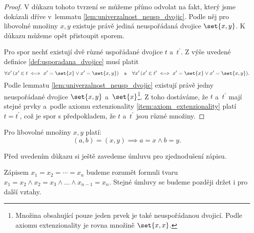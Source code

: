 \begin{proof}
    V důkazu tohoto tvrzení se můžeme přímo odvolat na fakt, který jsme dokázali dříve v~lemmatu \ref{lem:univerzalnost_neusp_dvojic}. Podle něj pro libovolné množiny $x,y$ existuje právě jediná neuspořádaná dvojice $\set{x,y}$. K důkazu můžeme opět přistoupit sporem.\par
    Pro spor nechť existují dvě různé uspořádané dvojice $t$ a~$t^\prime$. Z výše uvedené definice \ref{def:usporadana_dvojice} musí platit
    \begin{equation*}
        \forall x^\prime\,(x^\prime\in t \iff x^\prime=\set{x} \lor x^\prime=\set{x,y})\quad\text{a}\quad \forall x^\prime\,(x^\prime\in t^\prime \iff x^\prime=\set{x} \lor x^\prime=\set{x,y}).
    \end{equation*}
    Podle lemmatu \ref{lem:univerzalnost_neusp_dvojic} existují právě jedny neuspořádané dvojice $\set{x,y}$ a~$\set{x}$\footnote{Množina obsahující pouze jeden prvek je také neuspořádanou dvojicí. Podle axiomu extenzionality je rovna množině $\set{x,x}$.}. Z toho dostáváme, že $t$ a~$t^\prime$ mají stejné prvky a~podle axiomu extenzionality \ref{item:axiom_extenzionality} platí $t=t^\prime$, což je spor s předpokladem, že $t$ a~$t^\prime$ jsou různé množiny.
\end{proof}
\begin{lemma}\label{lem:vlastnost_usp_dvojic}
    Pro libovolné množiny $x,y$ platí:
    \begin{equation*}
        (a,b)=(x,y) \implies a=x \land b=y.
    \end{equation*}
\end{lemma}
Před uvedením důkazu si ještě zavedeme úmluvu pro zjednodušení zápisu.
\begin{convention}
    Zápisem $x_1=x_2=\cdots=x_n$ budeme rozumět formuli tvaru $x_1=x_2 \land x_2=x_3 \land \dots \land x_{n-1}=x_n$. Stejné úmluvy se budeme později držet i pro další vztahy.
\end{convention}
